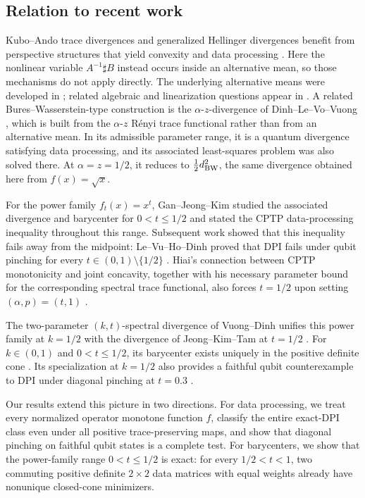 \documentclass[11pt]{amsart}
\theoremstyle{definition}
\theoremstyle{remark}
\begin{document}
	\subsection*{Relation to recent work}
	Kubo--Ando trace divergences and generalized Hellinger divergences benefit from
	perspective structures that yield convexity and data processing
	\cite{BGJ2019,PitrikVirosztek2020,OsakaShudo2025}.  Here the nonlinear variable
	$A^{-1}\sharp B$ instead occurs inside an alternative mean, so those
	mechanisms do not apply directly.  The underlying alternative means were
	developed in \cite{DumitruFrancoKimCzerwinska2026}; related algebraic and
	linearization questions appear in
	\cite{GanKimMer2026,DumitruFrancoMerino2026,KimMer2026}. A related Bures--Wasserstein-type construction is the
	$\alpha$-$z$-divergence of Dinh--Le--Vo--Vuong
	\cite{DinhLeVoVuong2021}, which is built from the
	$\alpha$-$z$ R\'enyi trace functional rather than from an alternative
	mean.  In its admissible parameter range, it is a quantum divergence
	satisfying data processing, and its associated least-squares problem was
	also solved there.  At $\alpha=z=1/2$, it reduces to
	$\tfrac12d_{\rm BW}^2$, the same divergence obtained here from
	$f(x)=\sqrt{x}$.
	
For the power family $f_t(x)=x^t$, Gan--Jeong--Kim
	\cite{GanJeongKim2025} studied the associated divergence and barycenter
	for $0<t\le1/2$ and stated the CPTP data-processing inequality throughout
	this range.  Subsequent work showed that this inequality fails away from
	the midpoint: Le--Vu--Ho--Dinh proved that DPI fails under qubit pinching
	for every $t\in(0,1)\setminus\{1/2\}$
	\cite[Theorem~5.4]{LeVuHoDinh2026}.  Hiai's connection between CPTP
	monotonicity and joint concavity, together with his necessary parameter
	bound for the corresponding spectral trace functional, also forces
	$t=1/2$ upon setting $(\alpha,p)=(t,1)$
	\cite[Theorem~5.3(1) and Proposition~5.19(1)]{Hiai2026}.
	
	The two-parameter $(k,t)$-spectral divergence of Vuong--Dinh unifies this
	power family at $k=1/2$ with the divergence of Jeong--Kim--Tam
	\cite{JKT2025} at $t=1/2$ \cite[Remark~3.7]{VuongDinh2026}.  For
	$k\in(0,1)$ and $0<t\le1/2$, its barycenter exists uniquely in the
	positive definite cone \cite[Theorem~3.20]{VuongDinh2026}.  Its
	specialization at $k=1/2$ also provides a faithful qubit counterexample
	to DPI under diagonal pinching at $t=0.3$
	\cite[Proposition~4.3(b)]{VuongDinh2026}.

Our results extend this picture in two directions.  For data processing,
we treat every normalized operator monotone function $f$, classify the
entire exact-DPI class even under all positive trace-preserving maps, and
show that diagonal pinching on faithful qubit states is a complete test.
For barycenters, we show that the power-family range $0<t\le1/2$ is exact:
for every $1/2<t<1$, two commuting positive definite $2\times2$ data
matrices with equal weights already have nonunique closed-cone minimizers.	
\end{document}
